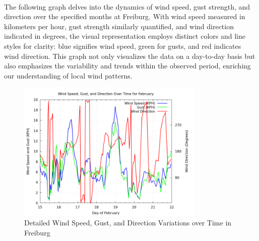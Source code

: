 \documentclass[11pt]{article}
\begin{document}
\paragraph{}The following graph delves into the dynamics of wind speed, gust strength, and direction over the specified months at Freiburg. With wind speed measured in kilometers per hour, gust strength similarly quantified, and wind direction indicated in degrees, the visual representation employs distinct colors and line styles for clarity: blue signifies wind speed, green for gusts, and red indicates wind direction. This graph not only visualizes the data on a day-to-day basis but also emphasizes the variability and trends within the observed period, enriching our understanding of local wind patterns.
\begin{figure}[h]
\centering
\includegraphics[width=0.8\textwidth]{data/graph/wind_speed_gust_direction_graph.png}
\caption{Detailed Wind Speed, Gust, and Direction Variations over Time in Freiburg}
\end{figure}
\end{document}
